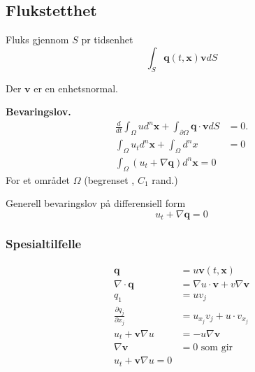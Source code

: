 \documentclass{article}
\theoremstyle{remark}
\begin{document}

\subsection{Flukstetthet}%
\label{sub:flukstetthet}

Fluks gjennom $S$ pr tidsenhet \[
\int_{S}^{} \mathbf{q} \left( t, \mathbf{x} \right) \mathbf{v} dS  
\] 

Der $\mathbf{v}$ er en enhetsnormal.
\par
\textbf{Bevaringslov.} \[
  \begin{split}
\frac{d }{d t} \int_{\Omega }^{}  u d ^{n} \mathbf{x} + \int_{\partial \Omega }^{} \mathbf{q} \cdot  \mathbf{v} dS  & = 0   .\\
\int_{\Omega }^{} u_{t} d^{n} \mathbf{x} + \int_{\Omega }^{} d ^{n} x  &= 0  \\
\int_{\Omega }^{} \left( u_{t} + \nabla \mathbf{q} \right) d^{n} \mathbf{x} = 0  
  \end{split} 
\]  
For et området $\Omega $ (begrenset ,  $C_{1} $ rand.)

\begin{definition}
  Generell bevaringslov på differensiell form \[
  u_{t} + \nabla \mathbf{q} = 0
  \] 
\end{definition}

\subsubsection{Spesialtilfelle}%
\label{ssub:spesialtilfelle}

\[
\begin{split}
\mathbf{q}  & = u \mathbf{v}\left( t, \mathbf{x} \right) \\
\nabla \cdot \mathbf{q}  &  = \nabla u \cdot \mathbf{v} + v \nabla \mathbf{v}\\
q_{1}  & = u v_{j} \\
\frac{\partial q_{j}}{\partial x_{j}}  &= u_{x_{j}} v_{j} + u \cdot v_{x_{j}} \\
u_{t} + \mathbf{v} \nabla u &=  -u \nabla \mathbf{v} \\
\nabla \mathbf{v}  & = 0 \text{ som gir } \\
u_{t} + \mathbf{v} \nabla u = 0 \\
\end{split} 
\]  
\end{document}
